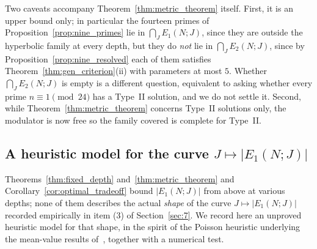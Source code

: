 \documentclass[11pt, a4paper]{article}
\theoremstyle{plain}
\theoremstyle{definition}
\begin{document}
Two caveats accompany Theorem~\ref{thm:metric_theorem} itself. First, it is an upper bound only; in particular the fourteen primes of Proposition~\ref{prop:nine_primes} lie in $\bigcap_{J}E_1(N;J)$, since they are outside the hyperbolic family at every depth, but they do \emph{not} lie in $\bigcap_J E_2(N;J)$, since by Proposition~\ref{prop:nine_resolved} each of them satisfies Theorem~\ref{thm:gen_criterion}(ii) with parameters at most $5$. Whether $\bigcap_J E_2(N;J)$ is empty is a different question, equivalent to asking whether every prime $n\equiv1\pmod{24}$ has a Type~II solution, and we do not settle it. Second, while Theorem~\ref{thm:metric_theorem} concerns Type~II solutions only, the modulator is now free so the family covered is complete for Type~II.

\subsection{A heuristic model for the curve $J\mapsto|E_1(N;J)|$}\label{sec:curve_model}

Theorems~\ref{thm:fixed_depth} and~\ref{thm:metric_theorem} and Corollary~\ref{cor:optimal_tradeoff} bound $|E_1(N;J)|$ from above at various depths; none of them describes the actual \emph{shape} of the curve $J\mapsto|E_1(N;J)|$ recorded empirically in item (3) of Section~\ref{sec:7}. We record here an unproved heuristic model for that shape, in the spirit of the Poisson heuristic underlying the mean-value results of~\cite[\S1]{pomerance2026}, together with a numerical test.
\end{document}
